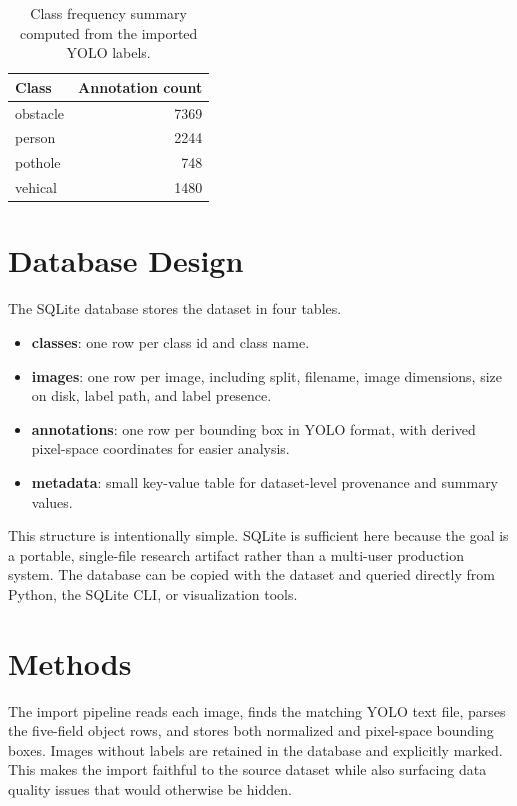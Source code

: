 \documentclass[11pt]{article}
\begin{document}
\begin{table}[h]
\centering
\begin{tabular}{lr}
\toprule
Class & Annotation count \\
\midrule
obstacle & 7369 \\
person & 2244 \\
pothole & 748 \\
vehical & 1480 \\
\bottomrule
\end{tabular}
\caption{Class frequency summary computed from the imported YOLO labels.}
\end{table}

\section{Database Design}
The SQLite database stores the dataset in four tables.

\begin{itemize}
\item \textbf{classes}: one row per class id and class name.
\item \textbf{images}: one row per image, including split, filename, image dimensions, size on disk, label path, and label presence.
\item \textbf{annotations}: one row per bounding box in YOLO format, with derived pixel-space coordinates for easier analysis.
\item \textbf{metadata}: small key-value table for dataset-level provenance and summary values.
\end{itemize}

This structure is intentionally simple. SQLite is sufficient here because the goal is a portable, single-file research artifact rather than a multi-user production system. The database can be copied with the dataset and queried directly from Python, the SQLite CLI, or visualization tools.

\section{Methods}
The import pipeline reads each image, finds the matching YOLO text file, parses the five-field object rows, and stores both normalized and pixel-space bounding boxes. Images without labels are retained in the database and explicitly marked. This makes the import faithful to the source dataset while also surfacing data quality issues that would otherwise be hidden.
\end{document}
